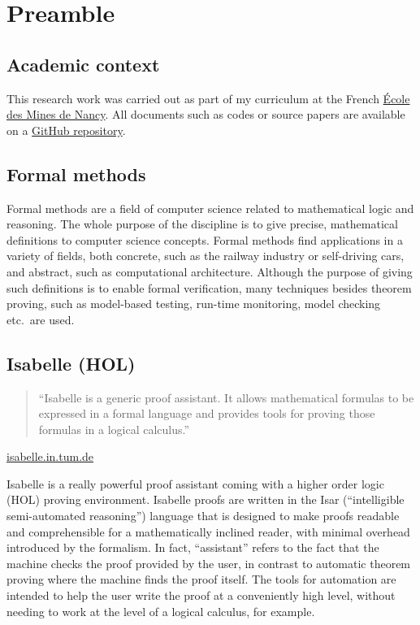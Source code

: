 \documentclass[a4 paper, 12pt]{article}
\theoremstyle{definition}
\begin{document}
\pagebreak


\tableofcontents

\pagebreak

\section{Preamble}
\subsection{Academic context}
This research work was carried out as part of my curriculum at the French \href{https://mines-nancy.univ-lorraine.fr}{École des Mines de Nancy}. All documents such as codes or source papers are available on a \href{https://github.com/VTrelat/Tarjan}{GitHub repository}.

\subsection{Formal methods}
Formal methods are a field of computer science related to mathematical logic and reasoning. The whole purpose of the discipline is to give precise, mathematical definitions to computer science concepts. Formal methods find applications in a variety of fields, both concrete, such as the railway industry or self-driving cars, and abstract, such as computational architecture. Although the purpose of giving such definitions is to enable formal verification, many techniques besides theorem proving, such as model-based testing, run-time monitoring, model checking etc.\ are used.

\subsection{Isabelle (HOL)}
\begin{quote}
    ``Isabelle is a generic proof assistant. It allows mathematical formulas to be expressed in a formal language and provides tools for proving those formulas in a logical calculus.''
\end{quote}
\begin{flushright}
    \href{https://isabelle.in.tum.de/}{isabelle.in.tum.de}
\end{flushright}
Isabelle \cite{nipkow_isabellehol_2002} is a really powerful proof assistant coming with a higher order logic (HOL) proving environment. Isabelle proofs are written in the Isar (``intelligible semi-automated reasoning'') language that is designed to make proofs readable and comprehensible for a mathematically inclined reader, with minimal overhead introduced by the formalism. In fact, ``assistant'' refers to the fact that the machine checks the proof provided by the user, in contrast to automatic theorem proving where the machine finds the proof itself. The tools for automation are intended to help the user write the proof at a conveniently high level, without needing to work at the level of a logical calculus, for example.
\end{document}
